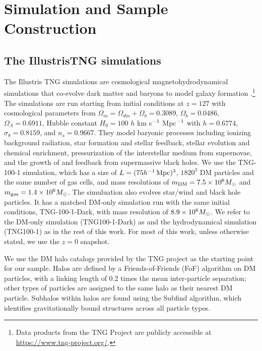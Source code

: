 \section{Simulation and Sample Construction}
\label{sec:sim_sample}

\subsection{The IllustrisTNG simulations}
\label{sec:sim}

The Illustris TNG simulations are cosmological magnetohydrodynamical simulations that co-evolve dark matter and baryons to model galaxy formation \citep{springel_first_2018,nelson_first_2018,pillepich_first_2018,naiman_first_2018,marinacci_first_2018}.\footnote{Data products from the TNG Project are publicly accessible at \url{https://www.tng-project.org/}.}
The simulations are run starting from initial conditions at $z=127$ with cosmological parameters from \cite{ade_planck_2016} $\Omega_m = \Omega_{dm} + \Omega_b = 0.3089$, $\Omega_b = 0.0486$, $\Omega_\Lambda = 0.6911$, Hubble constant $H_0 = 100$ $h$ km s$^{-1}$ Mpc$^{-1}$ with $h = 0.6774$, $\sigma_8 = 0.8159$, and $n_s = 0.9667$.
They model baryonic processes including ionizing background radiation, star formation and stellar feedback, stellar evolution and chemical enrichment, pressurization of the interstellar medium from supernovae, and the growth of and feedback from supermassive black holes.   
We use the TNG-100-1 simulation, which has a size of $L = (75 h^{-1}\,\mathrm{Mpc})^3$, $1820^3$ DM particles and the same number of gas cells, and mass resolutions of $m_\text{DM} = 7.5 \times 10^6 M_\mathrm{\odot}$ and $m_\text{gas} = 1.4 \times 10^6 M_\mathrm{\odot}$.
The simuluation also evolves star/wind and black hole particles.
It has a matched DM-only simulation run with the same initial conditions, TNG-100-1-Dark, with mass resolution of $8.9 \times 10^6 M_\mathrm{\odot}$.
We refer to the DM-only simulation (TNG100-1-Dark) as \dark and the hydrodynamical simulation (TNG100-1) as \hydro in the rest of this work.
For most of this work, unless otherwise stated, we use the $z=0$ snapshot.

We use the DM halo catalogs provided by the TNG project as the starting point for our sample.
Halos are defined by a Friends-of-Friends (FoF) algorithm on DM particles, with a linking length of 0.2 times the mean inter-particle separation; other types of particles are assigned to the same halo as their nearest DM particle.
Subhalos within halos are found using the Subfind algorithm, which identifies gravitationally bound structures across all particle types.


